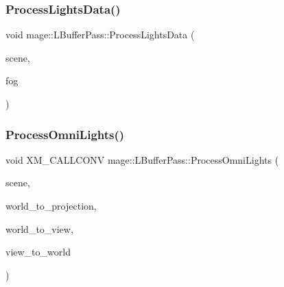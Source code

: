 \subsubsection{\texorpdfstring{Process\+Lights\+Data()}{ProcessLightsData()}}
{\footnotesize\ttfamily void mage\+::\+L\+Buffer\+Pass\+::\+Process\+Lights\+Data (\begin{DoxyParamCaption}\item[{const \hyperlink{classmage_1_1_scene}{Scene} \&}]{scene,  }\item[{const \hyperlink{classmage_1_1_fog}{Fog} \&}]{fog }\end{DoxyParamCaption})\hspace{0.3cm}{\ttfamily [private]}}

\hypertarget{classmage_1_1_l_buffer_pass_a6c33b00709c8440dbe3e1d37f6e0269a}{}\label{classmage_1_1_l_buffer_pass_a6c33b00709c8440dbe3e1d37f6e0269a} 
\subsubsection{\texorpdfstring{Process\+Omni\+Lights()}{ProcessOmniLights()}}
{\footnotesize\ttfamily void X\+M\+\_\+\+C\+A\+L\+L\+C\+O\+NV mage\+::\+L\+Buffer\+Pass\+::\+Process\+Omni\+Lights (\begin{DoxyParamCaption}\item[{const \hyperlink{classmage_1_1_scene}{Scene} \&}]{scene,  }\item[{F\+X\+M\+M\+A\+T\+R\+IX}]{world\+\_\+to\+\_\+projection,  }\item[{C\+X\+M\+M\+A\+T\+R\+IX}]{world\+\_\+to\+\_\+view,  }\item[{C\+X\+M\+M\+A\+T\+R\+IX}]{view\+\_\+to\+\_\+world }\end{DoxyParamCaption})\hspace{0.3cm}{\ttfamily [private]}}

\hypertarget{classmage_1_1_l_buffer_pass_a6886e49e2611592a73fc76cd4e4af307}{}\label{classmage_1_1_l_buffer_pass_a6886e49e2611592a73fc76cd4e4af307} 
